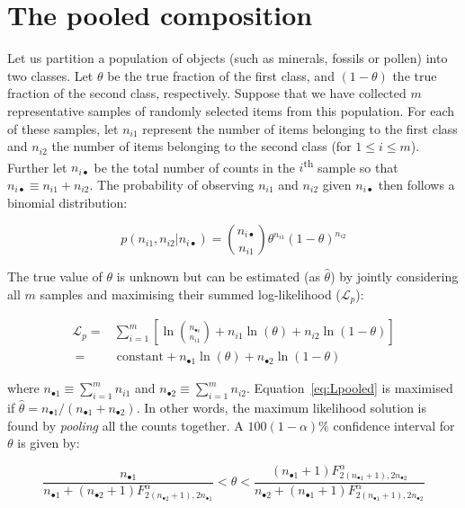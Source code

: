 \documentclass{article}
\begin{document}
\section{The pooled composition}
\label{sec:pooled}

Let us partition a population of objects (such as minerals, fossils or
pollen) into two classes. Let $\theta$ be the true fraction of the
first class, and $(1-\theta)$ the true fraction of the second class,
respectively. Suppose that we have collected $m$ representative
samples of randomly selected items from this population. For each of
these samples, let $n_{i1}$ represent the number of items belonging to
the first class and $n_{i2}$ the number of items belonging to the
second class (for $1 \leq i \leq m$). Further let $n_{i\bullet}$ be
the total number of counts in the $i$\textsuperscript{th} sample so
that $n_{i\bullet} \equiv n_{i1} + n_{i2}$. The probability of
observing $n_{i1}$ and $n_{i2}$ given $n_{i\bullet}$ then follows a
binomial distribution:

\begin{equation}
  p(n_{i1},n_{i2}|n_{i\bullet}) =
  \binom{n_{i\bullet}}{n_{i1}} \theta^{n_{i1}}
  (1-\theta)^{n_{i2}}
  \label{eq:pnN}
\end{equation}

The true value of $\theta$ is unknown but can be estimated (as
$\hat{\theta}$) by jointly considering all $m$ samples and maximising
their summed log-likelihood ($\mathcal{L}_p$):

\begin{equation}
  \begin{split}
  \mathcal{L}_p = & \sum\limits_{i=1}^{m}
  \left[
    \ln\binom{n_{\bullet i}}{n_{i1}} + n_{i1} \ln(\theta) + n_{i2} \ln(1-\theta)
    \right] \\
  ~ = & \mathrm{~constant} + n_{\bullet 1} \ln(\theta) +
  n_{\bullet 2} \ln(1-\theta)
  \end{split}
  \label{eq:Lpooled}
\end{equation}

\noindent where $n_{\bullet 1} \equiv \sum_{i=1}^{m} n_{i1}$ and
$n_{\bullet 2} \equiv \sum_{i=1}^{m}
n_{i2}$. Equation~\ref{eq:Lpooled} is maximised if $\hat{\theta} =
n_{\bullet 1}/(n_{\bullet 1}+n_{\bullet 2})$.  In other words, the
maximum likelihood solution is found by \emph{pooling} all the counts
together. A $100(1-\alpha)\%$ confidence interval for $\theta$ is
given by:

\begin{equation}
  \frac{n_{\bullet 1}}{ n_{\bullet 1} +
    (n_{\bullet 2}+1) F^{\alpha}_{2(n_{\bullet 2}+1),2n_{\bullet 1}}
  }
  <
  \theta
  <
  \frac{(n_{\bullet 1}+1) F^{\alpha}_{2(n_{\bullet 1}+1),2n_{\bullet 2}}}
       {n_{\bullet 2} + (n_{\bullet 1}+1) F^{\alpha}_{2(n_{\bullet 1}+1),2n_{\bullet 2}}}
  \label{eq:pooledCI}
\end{equation}
\end{document}
